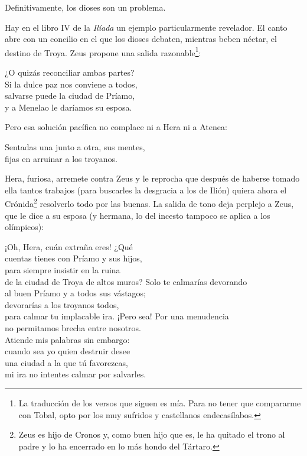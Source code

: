 \label{cap:calipso}

Definitivamente, los dioses son un problema.


Hay en el libro IV de la \emph{Ilíada} un ejemplo particularmente revelador. El canto abre con un concilio en el que los dioses debaten, mientras beben néctar, el destino de Troya. Zeus propone una salida razonable\footnote{La traducción de los versos que siguen es mía. Para no tener que compararme con Tobal, opto por los muy sufridos y castellanos endecasílabos.}:

\begin{versocita}
¿O quizás reconciliar ambas partes?\\
Si la dulce paz nos conviene a todos,\\
salvarse puede la ciudad de Príamo,\\
y a Menelao le daríamos su esposa.
\end{versocita}

Pero esa solución pacífica no complace ni a Hera ni a Atenea:

\begin{versocita}
Sentadas una junto a otra, sus mentes,\\
fijas en arruinar a los troyanos.
\end{versocita}

Hera, furiosa, arremete contra Zeus y le reprocha que después de haberse tomado ella tantos trabajos (para buscarles la desgracia a los de Ilión) quiera ahora el Crónida\footnote{Zeus es hijo de Cronos y, como buen hijo que es, le ha quitado el trono al padre y lo ha encerrado en lo más hondo del Tártaro.} resolverlo todo por las buenas. La salida de tono deja perplejo a Zeus, que le dice a su esposa (y hermana, lo del incesto tampoco se aplica a los olímpicos):

\begin{versocita}
¡Oh, Hera, cuán extraña eres! ¿Qué\\
cuentas tienes con Príamo y sus hijos,\\
para siempre insistir en la ruina\\
de la ciudad de Troya de altos muros?
\stanzabreak
Solo te calmarías devorando\\
al buen Príamo y a todos sus vástagos;\\
devorarías a los troyanos todos,\\
para calmar tu implacable ira.
\stanzabreak
¡Pero sea! Por una menudencia\\
no permitamos brecha entre nosotros.\\
Atiende mis palabras sin embargo:\\
cuando sea yo quien destruir desee\\
una ciudad a la que tú favorezcas,\\
mi ira no intentes calmar por salvarles.
\end{versocita}

